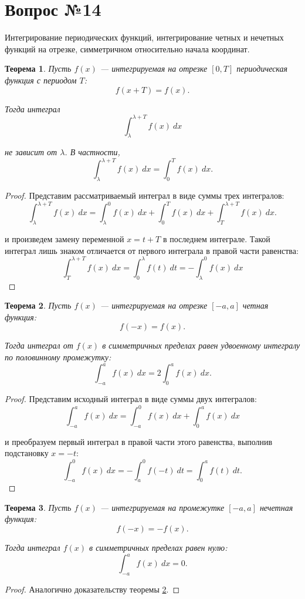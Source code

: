 \documentclass[12pt]{report}
\numberwithin{equation}{section}
\newtheorem{theorem}{Теорема}[section]
\begin{document}
\newpage \section{Вопрос №14} %
\begin{framed}
Интегрирование периодических функций, интегрирование четных и нечетных функций на
отрезке, симметричном относительно начала координат.
\end{framed}
\begin{theorem} \label{th:14:1}
Пусть $f(x)$ --- интегрируемая на отрезке $[0,T]$ периодическая функция с периодом $T$:
\[ f(x+T) = f(x).\]

Тогда интеграл
\[ \int_{\lambda}^{\lambda +T} f(x)~dx\]

не зависит от $\lambda$. В частности,
\[\int_{\lambda}^{\lambda + T} f(x)~dx = \int_0^{T} f(x)~dx. \]
\end{theorem}

\begin{proof}
Представим рассматриваемый интеграл в виде  суммы трех интегралов:
\[\int_{\lambda}^{\lambda + T} f(x)~dx = \int_{\lambda}^0 f(x)~dx + \int_0^T f(x)~dx + \int_T^{\lambda + T} f(x)~dx.\]

и произведем замену переменной $x = t + T$ в последнем интеграле. Такой  интеграл лишь знаком отличается от первого интеграла в правой части равенства:
\[ \int_T^{\lambda + T} f(x)~dx = \int_0^{\lambda} f(t)~dt = -\int_{\lambda}^0 f(x)~dx \]
\end{proof}

\begin{theorem} \label{th:14:2}
Пусть $f(x)$ --- интегрируемая на отрезке $[-a, a]$ четная функция:
\[ f(-x) = f(x). \]

Тогда интеграл от $f(x)$ в симметричных пределах равен удвоенному интегралу по половинному промежутку:
\[ \int_{-a}^{a}f(x)~dx = 2 \int_0^a f(x)~dx.\]
\end{theorem}
\begin{proof}
Представим исходный интеграл в виде суммы двух интегралов:
\[\int_{-a}^{a}f(x)~dx = \int_{-a}^0f(x)~dx  + \int_{0}^{a}f(x)~dx \]

и преобразуем первый интеграл в правой части этого равенства, выполнив подстановку $x = -t$:
\[ \int_{-a}^{0}f(x)~dx = -\int_a^0 f(-t)~dt = \int_0^a f(t)~dt.\]
\end{proof}

\begin{theorem} \label{th:15:3}
Пусть $f(x)$ --- интегрируемая на промежутке $[-a,a]$ нечетная функция:
\[ f(-x) = -f(x).\]

Тогда интеграл $f(x)$ в симметричных пределах равен нулю:
\[ \int_{-a}^a f(x)~dx = 0.\]
\end{theorem}
\begin{proof}
Аналогично доказательству теоремы \ref{th:14:2}.
\end{proof}
\end{document}
